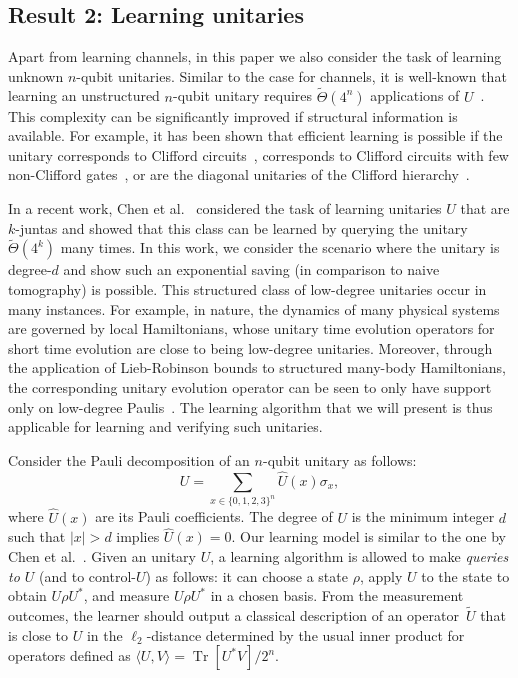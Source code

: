 \documentclass[11pt]{article}
\theoremstyle{plain}
\DeclareMathOperator{\Tr}{Tr}
\theoremstyle{plain}
\theoremstyle{definition}
\theoremstyle{remark}
\theoremstyle{named}
\begin{document}
\subsection{Result 2: Learning unitaries}
Apart from learning channels, in this paper we also consider the task of learning unknown $n$-qubit unitaries. Similar to the case for channels, it is well-known that learning an unstructured $n$-qubit unitary requires $\widetilde\Theta(4^n)$ applications of $U$~\cite{gutoski2014process}. This complexity can be significantly improved if structural information is available. For example, it has been shown that efficient learning is possible if the unitary corresponds to Clifford circuits~\cite{low2009learning}, corresponds to Clifford circuits with few non-Clifford gates~\cite{lai2022learn}, or are the diagonal unitaries of the Clifford hierarchy~\cite{arunachalam2022optimal}.

In a recent work, Chen et al.~\cite{chen2023testing} considered the task of learning unitaries $U$ that are $k$-juntas and showed that this class can be learned by querying the unitary $\widetilde\Theta(4^k)$ many times.  In this work, we consider the scenario where the unitary is degree-$d$ and show such an exponential saving (in comparison to naive tomography) is possible. This structured class of low-degree unitaries occur in many instances. For example, in nature, the dynamics of many physical systems are governed by local Hamiltonians, whose unitary time evolution operators for short time evolution are close to being low-degree unitaries. Moreover, through the application of Lieb-Robinson bounds to structured many-body Hamiltonians, the corresponding unitary evolution operator can be seen to only have support only on low-degree Paulis~\cite{chen2023speed}. The learning algorithm that we will present is thus applicable for learning and verifying such unitaries.

Consider the Pauli decomposition of an $n$-qubit unitary as follows:
$$
U=\sum_{x\in \{0,1,2,3\}^n} \widehat U(x)\sigma_x,
$$ where $\widehat U(x)$ are its Pauli coefficients. The degree of $U$ is the minimum integer $d$ such that $|x|>d$ implies $\widehat U(x)=0$. Our learning model is similar to the one by Chen et al.~\cite{chen2023testing}. Given an unitary $U$, a learning algorithm is allowed to make \emph{queries to $U$} (and to control-$U$) as follows: it can choose a state $\rho$, apply $U$ to the state to obtain $U\rho U^*$, and measure $U\rho U^*$ in a chosen basis. From the measurement outcomes, the learner should output a classical description of an operator~$\widetilde U$ that is close to $U$ in the $\ell_2$-distance determined by the usual inner product for operators defined as $\langle U, V\rangle=\Tr[U^* V]/2^n$.
\end{document}
